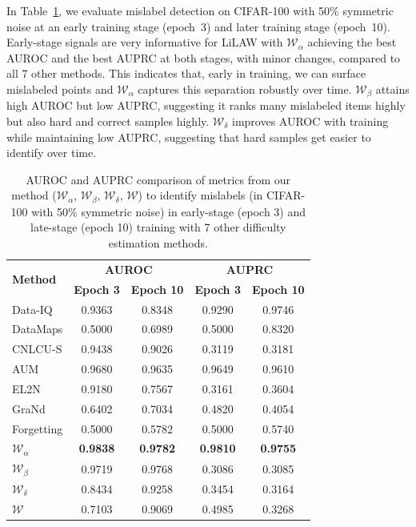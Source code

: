 \documentclass{article}
\theoremstyle{plain}
\theoremstyle{definition}
\theoremstyle{remark}
\begin{document}
In Table~\ref{table:comp}, we evaluate mislabel detection on CIFAR-100 with 50\% symmetric noise at an early training stage (epoch~3) and later training stage (epoch~10). Early-stage signals are very informative for LiLAW with $\mathcal{W}_\alpha$ achieving the best AUROC and the best AUPRC at both stages, with minor changes, compared to all 7 other methods. This indicates that, early in training, we can surface mislabeled points and $\mathcal{W}_\alpha$ captures this separation robustly over time. $\mathcal{W}_\beta$ attains high AUROC but low AUPRC, suggesting it ranks many mislabeled items highly but also hard and correct samples highly. $\mathcal{W}_\delta$ improves AUROC with training while maintaining low AUPRC, suggesting that hard samples get easier to identify over time. %

\begin{table}[h!]
\centering
\footnotesize{
\begin{tabular}{l|cc|cc}
\toprule
\multirow{2}{*}{\textbf{Method}} & \multicolumn{2}{c|}{\textbf{AUROC}} & \multicolumn{2}{c}{\textbf{AUPRC}} \\
 & \textbf{Epoch 3} & \textbf{Epoch 10} & \textbf{Epoch 3} & \textbf{Epoch 10} \\
\midrule
Data-IQ \citep{seedat_data-iq_2022}      & 0.9363 & 0.8348 & 0.9290 & 0.9746 \\
DataMaps \citep{swayamdipta_dataset_2020}     & 0.5000 & 0.6989 & 0.5000 & 0.8320 \\
CNLCU-S \citep{xia_sample_2021}        & 0.9438 & 0.9026 & 0.3119 & 0.3181 \\
AUM \citep{pleiss_identifying_2020}        & 0.9680 & 0.9635 & 0.9649 & 0.9610 \\
EL2N \citep{paul_deep_2023}        & 0.9180 & 0.7567 & 0.3161 & 0.3604 \\
GraNd \citep{paul_deep_2023}       & 0.6402 & 0.7034 & 0.4820 & 0.4054 \\
Forgetting \citep{toneva_empirical_2019}  & 0.5000 & 0.5782 & 0.5000 & 0.5740 \\ \midrule
$\mathcal{W}_\alpha$        & \textbf{0.9838} & \textbf{0.9782} & \textbf{0.9810} & \textbf{0.9755} \\
$\mathcal{W}_\beta$         & 0.9719 & 0.9768 & 0.3086 & 0.3085 \\
$\mathcal{W}_\delta$        & 0.8434 & 0.9258 & 0.3454 & 0.3164 \\
$\mathcal{W}$       & 0.7103 & 0.9069 & 0.4985 & 0.3268 \\
\bottomrule
\end{tabular}}
\caption{AUROC and AUPRC comparison of metrics from our method ($\mathcal{W}_\alpha$, $\mathcal{W}_\beta$, $\mathcal{W}_\delta$, $\mathcal{W}$) to identify mislabels (in CIFAR-100 with 50\% symmetric noise) in early-stage (epoch 3) and late-stage (epoch 10) training with 7 other difficulty estimation methods.} %
\label{table:comp}
\end{table}
\end{document}
